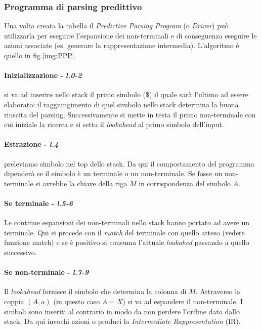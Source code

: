 \subsubsection{Programma di parsing predittivo}
Una volta creata la tabella il \textit{Predictive Parsing Program}
(o \textit{Driver}) pu\`o utilizzarla per eseguire l'espansione dei
non-terminali e di conseguenza eseguire le azioni associate (es. generare la
rappresentazione intermedia). L'algoritmo \`e quello in fig.\ref{img:PPP}.

\paragraph{Inizializzazione - \textit{l.0-2}}
si va ad inserire nello stack il primo simbolo (\$) il quale sar\`a l'ultimo ad
essere elaborato: il raggiungimento di quel simbolo nello stack determina la
buona riuscita del parsing. Successivamente si mette in testa il primo
non-terminale con cui iniziale la ricerca e si setta il \textit{lookahead} al
primo simbolo dell'input.

\paragraph{Estrazione - \textit{l.4}}
\label{par:extraction}
preleviamo simbolo nel top dello stack. Da qui il comportamento del programma
dipender\`a se il simbolo \`e un terminale o un non-terminale. Se fosse un
non-terminale si avrebbe la chiave della riga $M$ in corrispondenza del simbolo
$A$.

\paragraph{Se terminale - \textit{l.5-6}}
\label{par:if_terminal}
Le continue espansioni dei non-terminali nello stack hanno portato ad avere un
terminale. Qui si procede con il \textit{match} del terminale con quello atteso
(vedere funzione match) e se \`e positivo si consuma l'attuale \textit{lookahed}
passando a quello successivo.

\paragraph{Se non-terminale - \textit{l.7-9}}
\label{par:if_non-terminal}
Il \textit{lookahead} fornisce il simbolo che determina la colonna di $M$.
Attraverso la coppia $(A,a)$ (in questo caso $A=X$) si va ad espandere il
non-terminale. I simboli sono inseriti al contrario in modo da non perdere
l'ordine dato dallo stack. Da qui invochi azioni o produci la
\textit{Intermediate Rappresentation} (IR).

